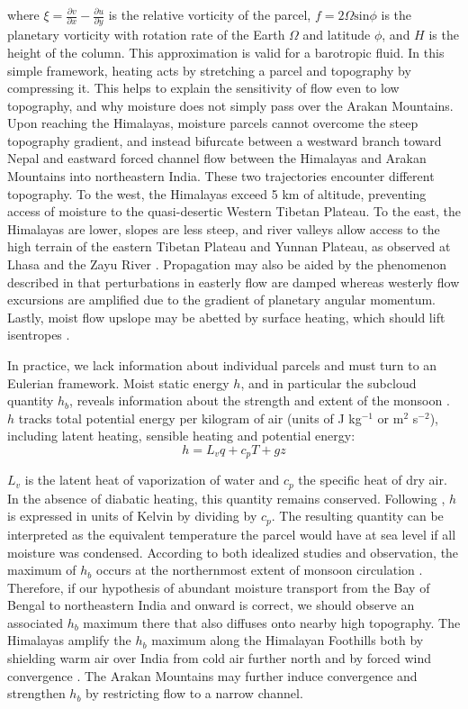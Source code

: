 \documentclass[12pt]{article}
\begin{document}
	where $\xi = \frac{\partial v}{\partial x}-\frac{\partial u}{\partial y}$ is the relative vorticity of the parcel, $f=2\Omega\mathrm{sin}\phi$ is the planetary vorticity with rotation rate of the Earth $\Omega$ and latitude $\phi$, and $H$ is the height of the column. This approximation is valid for a barotropic fluid. In this simple framework, heating acts by stretching a parcel and topography by compressing it. This helps to explain the sensitivity of flow even to low topography, and why moisture does not simply pass over the Arakan Mountains. Upon reaching the Himalayas, moisture parcels cannot overcome the steep topography gradient, and instead bifurcate between a westward branch toward Nepal and eastward forced channel flow between the Himalayas and Arakan Mountains into northeastern India. These two trajectories encounter different topography. To the west, the Himalayas exceed 5 km of altitude, preventing access of moisture to the quasi-desertic Western Tibetan Plateau. To the east, the Himalayas are lower, slopes are less steep, and river valleys allow access to the high terrain of the eastern Tibetan Plateau and Yunnan Plateau, as observed at Lhasa and the Zayu River \citep{Gao2011,Yang2011}. Propagation may also be aided by the phenomenon described in \cite{Holton2004} that perturbations in easterly flow are damped whereas westerly flow excursions are amplified due to the gradient of planetary angular momentum. Lastly, moist flow upslope may be abetted by surface heating, which should lift isentropes \citep{Molnar1999,Prive2007a}. 
	
	In practice, we lack information about individual parcels and must turn to an Eulerian framework. Moist static energy $h$, and in particular the subcloud quantity $h_b$, reveals information about the strength and extent of the monsoon \citep{Prive2007,Prive2007a}. $h$ tracks total potential energy per kilogram of air (units of J kg$^{-1}$ or m$^2$ s$^{-2}$), including latent heating, sensible heating and potential energy:
	\begin{displaymath}
			h= L_v q+c_p T+gz
	\end{displaymath}
		
	$L_v$ is the latent heat of vaporization of water and $c_p$ the specific heat of dry air. In the absence of diabatic heating, this quantity remains conserved. Following \cite{Boos2010}, $h$ is expressed in units of Kelvin by dividing by $c_p$. The resulting quantity can be interpreted as the equivalent temperature the parcel would have at sea level if all moisture was condensed. According to both idealized studies and observation, the maximum of $h_b$ occurs at the northernmost extent of monsoon circulation  \citep{Emanuel1995,Prive2007,Boos2010}. Therefore, if our hypothesis of abundant moisture transport from the Bay of Bengal to northeastern India and onward is correct, we should observe an associated $h_b$ maximum there that also diffuses onto nearby high topography. The Himalayas amplify the $h_b$ maximum along the Himalayan Foothills both by shielding warm air over India from cold air further north and by forced wind convergence \citep{Boos2010}. The Arakan Mountains may further induce convergence and strengthen $h_b$ by restricting flow to a narrow channel.
\end{document}
